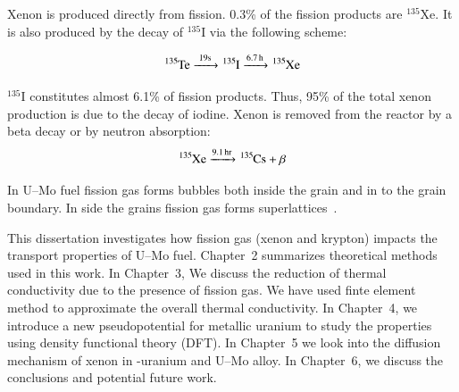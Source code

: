 Xenon is produced directly from fission. 0.3\% of the fission products are $^{135}$Xe. It is also produced by the decay of $^{135}$I via the following scheme:

\begin{equation*}
\ce{^{135}Te ->[$19 \text{s}$] ^{135}I ->[6.7h] ^{135}Xe}
\end{equation*}

$^{135}$I constitutes almost 6.1\% of fission products. Thus, 95\% of the total xenon production is due to the decay of iodine. Xenon is removed from the reactor by a beta decay or by neutron absorption:
\begin{equation*}
\ce{^{135}Xe ->[9.1 $\text{hr}$] ^{135}Cs + $\beta$}
\end{equation*}

In U--Mo fuel fission gas forms bubbles  both inside the grain and in to the grain boundary. In side the grains fission gas forms superlattices~\cite{miller2012advantages, gan2010transmission}. 

This dissertation investigates how fission gas (xenon and krypton) impacts the transport properties of U--Mo fuel. Chapter~2 summarizes theoretical methods used in this work. In Chapter~3, We discuss the reduction of thermal conductivity due to the presence of fission gas. We have used finte element method to approximate the overall thermal conductivity. In Chapter~4, we introduce a new pseudopotential for metallic uranium to study the properties using density functional theory (DFT). In Chapter~5 we look into the diffusion mechanism of xenon in \textgamma-uranium and U--Mo alloy. In Chapter~6, we discuss the conclusions and potential future work.




















